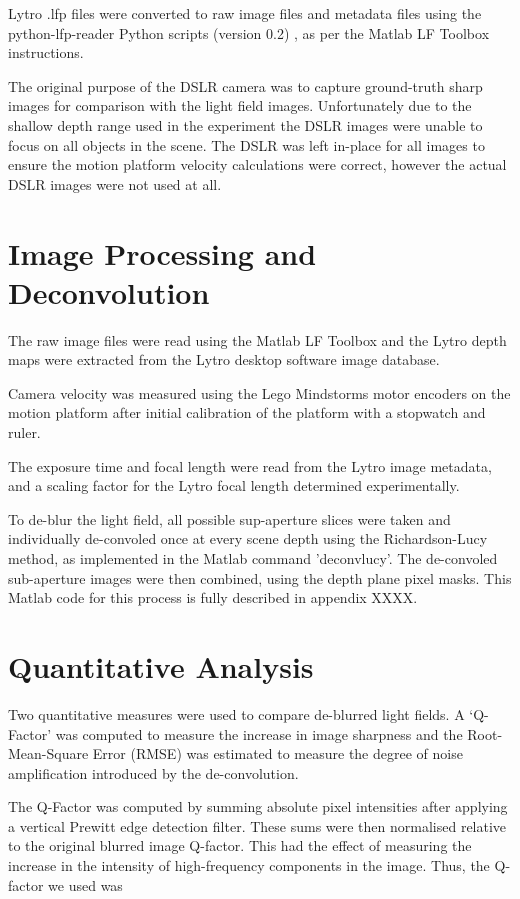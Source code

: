 Lytro .lfp files were converted to raw image files and metadata files using the python-lfp-reader Python scripts (version 0.2) \cite{esfahbod2013python}, as per the Matlab LF Toolbox instructions.

The original purpose of the DSLR camera was to capture ground-truth sharp images for comparison with the light field images.
Unfortunately due to the shallow depth range used in the experiment the DSLR images were unable to focus on all objects in the scene.
The DSLR was left in-place for all images to ensure the motion platform velocity calculations were correct, however the actual DSLR images were not used at all.

\section{Image Processing and Deconvolution}
\label{sec:image_processing_and_deconvolution}

The raw image files were read using the Matlab LF Toolbox and the Lytro depth maps were extracted from the Lytro desktop software image database.

Camera velocity was measured using the Lego Mindstorms motor encoders on the motion platform after initial calibration of the platform with a stopwatch and ruler.

The exposure time and focal length were read from the Lytro image metadata, and a scaling factor for the Lytro focal length determined experimentally.

To de-blur the light field, all possible sup-aperture slices were taken and individually de-convoled once at every scene depth using the Richardson-Lucy method, as implemented in the Matlab command 'deconvlucy'.
The de-convoled sub-aperture images were then combined, using the depth plane pixel masks.
This Matlab code for this process is fully described in appendix XXXX.


\section{Quantitative Analysis}
\label{sec:quantitative_analysis}

Two quantitative measures were used to compare de-blurred light fields.
A \enquote*{Q-Factor} was computed to measure the increase in image sharpness and the Root-Mean-Square Error (RMSE) was estimated to measure the degree of noise amplification introduced by the de-convolution.

The Q-Factor was computed by summing absolute pixel intensities after applying a vertical Prewitt edge detection filter.
These sums were then normalised relative to the original blurred image Q-factor.
This had the effect of measuring the increase in the intensity of high-frequency components in the image.
Thus, the Q-factor we used was

